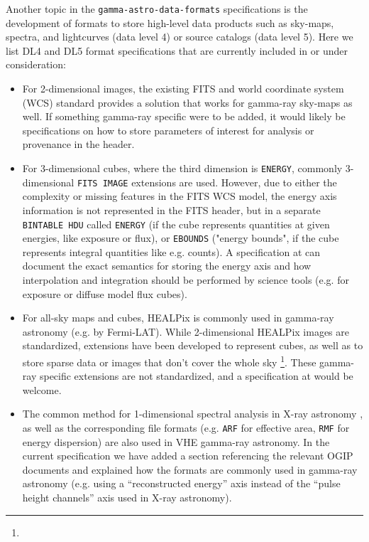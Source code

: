 Another topic in the \texttt{gamma-astro-data-formats} specifications is the development of formats to store high-level data products such as sky-maps, spectra, and lightcurves (data level 4) or source catalogs (data level 5).  Here we list DL4 and DL5 format specifications that are currently included in \gadf or under consideration:

\begin{itemize}
\item{} For 2-dimensional images, the existing FITS and world coordinate system (WCS) standard provides a solution that works for gamma-ray sky-maps as well. If something gamma-ray specific were to be added, it would likely be specifications on how to store parameters of interest for analysis or provenance in the header.
\item{} For 3-dimensional cubes, where the third dimension is \texttt{ENERGY}, commonly 3-dimensional \texttt{FITS IMAGE} extensions are used. However, due to either the complexity or missing features in the FITS WCS model, the energy axis information is not represented in the FITS header, but in a separate \texttt{BINTABLE HDU} called \texttt{ENERGY} (if the cube represents quantities at given energies, like exposure or flux), or \texttt{EBOUNDS} ("energy bounds", if the cube represents integral quantities like e.g. counts).
A specification at \gadf can document the exact semantics for storing the energy axis and how interpolation and integration should be performed by science tools (e.g. for exposure or diffuse model flux cubes).
\item{} For all-sky maps and cubes, HEALPix\cite{2005ApJ...622..759G} is commonly used in gamma-ray astronomy (e.g. by Fermi-LAT). While 2-dimensional HEALPix images are standardized, extensions have been developed to represent cubes, as well as to store sparse data or images that don't cover the whole sky \footnote{\pointlikedata}. These gamma-ray specific extensions are not standardized, and a specification at \gadf would be welcome.
\item{} The common method for 1-dimensional spectral analysis in X-ray astronomy \citep{Davis:2001}, as well as the corresponding file formats (e.g. \texttt{ARF} for effective area, \texttt{RMF} for energy dispersion) are also used in VHE gamma-ray astronomy. In the current specification we have added a section referencing the relevant OGIP documents and explained how the formats are commonly used in gamma-ray astronomy (e.g. using a ``reconstructed energy'' axis instead of the ``pulse height channels'' axis used in X-ray astronomy).

\end{itemize}
